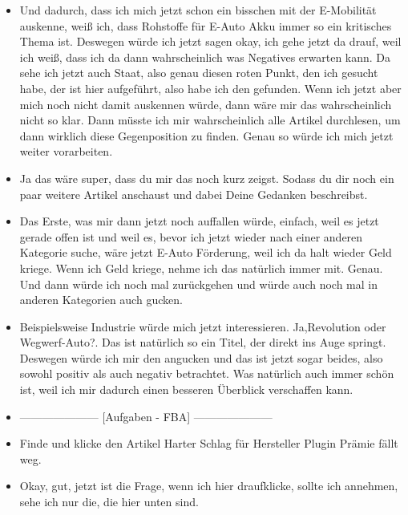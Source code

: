 {\begin{itemize}[]
    Das fehlt mir eigentlich ein bisschen, weil dann muss ich mir wirklich die Artikel Bezeichnungen durchlesen, bevor ich überhaupt weiß, wie dieser Artikel bewertet ist.
    Und da hätte ich halt, würde ich mir jetzt, wenn ich als Nutzer auf diese Seite gehe, wünschen, dass ich da sofort sehe, ist jetzt der positive und welches der negative Artikel ist.
    \item {} Und dadurch, dass ich mich jetzt schon ein bisschen mit der E-Mobilität auskenne, weiß ich, dass Rohstoffe für E-Auto Akku immer so ein kritisches Thema ist.
    Deswegen würde ich jetzt sagen okay, ich gehe jetzt da drauf, weil ich weiß, dass ich da dann wahrscheinlich was Negatives erwarten kann.
    Da sehe ich jetzt auch Staat, also genau diesen roten Punkt, den ich gesucht habe, der ist hier aufgeführt, also habe ich den gefunden.
    Wenn ich jetzt aber mich noch nicht damit auskennen würde, dann wäre mir das wahrscheinlich nicht so klar.
    Dann müsste ich mir wahrscheinlich alle Artikel durchlesen, um dann wirklich diese Gegenposition zu finden.
    Genau so würde ich mich jetzt weiter vorarbeiten.
    \item {} Ja das wäre super, dass du mir das noch kurz zeigst. 
    Sodass du dir noch ein paar weitere Artikel anschaust und dabei Deine Gedanken beschreibst.
    \item {} Das Erste, was mir dann jetzt noch auffallen würde, einfach, weil es jetzt gerade offen ist und weil es, bevor ich jetzt wieder nach einer anderen Kategorie suche, wäre jetzt \flqq E-Auto Förderung\frqq{}, weil ich da halt wieder Geld kriege.
    Wenn ich Geld kriege, nehme ich das natürlich immer mit.
    Genau.
    Und dann würde ich noch mal zurückgehen und würde auch noch mal in anderen Kategorien auch gucken.
    \item {} Beispielsweise Industrie würde mich jetzt interessieren.
    Ja,\flqq Revolution oder Wegwerf-Auto?\frqq{}.
    Das ist natürlich so ein Titel, der direkt ins Auge springt.
    Deswegen würde ich mir den angucken und das ist jetzt sogar beides, also sowohl positiv als auch negativ betrachtet.
    Was natürlich auch immer schön ist, weil ich mir dadurch einen besseren Überblick verschaffen kann.
    \item {---------------------} [Aufgaben - FBA] {---------------------}
    \item {} Finde und klicke den Artikel \flqq Harter Schlag für Hersteller Plugin Prämie fällt weg\frqq{}.
    \item {} Okay, gut, jetzt ist die Frage, wenn ich hier draufklicke, sollte ich annehmen, sehe ich nur die, die hier unten sind.

\end{itemize}}
